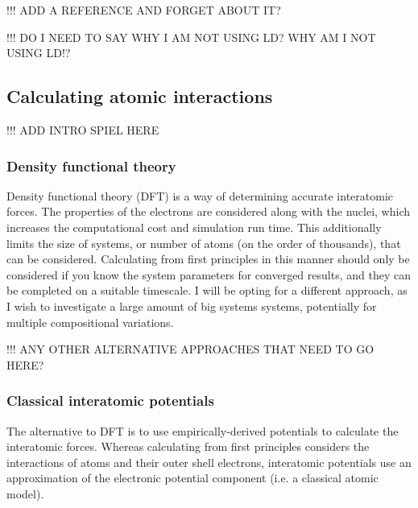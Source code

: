 !!! ADD A REFERENCE AND FORGET ABOUT IT?

!!! DO I NEED TO SAY WHY I AM NOT USING LD? WHY AM I NOT USING LD!?














\subsection{Calculating atomic interactions}

!!! ADD INTRO SPIEL HERE

\subsubsection{Density functional theory}

Density functional theory (DFT) is a way of determining accurate interatomic forces. The properties of the electrons are considered along with the nuclei, which increases the computational cost and simulation run time. This additionally limits the size of systems, or number of atoms (on the order of thousands), that can be considered. Calculating from first principles in this manner should only be considered if you know the system parameters for converged results, and they can be completed on a suitable timescale. I will be opting for a different approach, as I wish to investigate a large amount of big systems systems, potentially for multiple compositional variations.

!!! ANY OTHER ALTERNATIVE APPROACHES THAT NEED TO GO HERE?

\subsubsection{Classical interatomic potentials}

The alternative to DFT is to use empirically-derived potentials to calculate the interatomic forces. Whereas calculating from first principles considers the interactions of atoms and their outer shell electrons, interatomic potentials use an approximation of the electronic potential component (i.e. a classical atomic model). 

